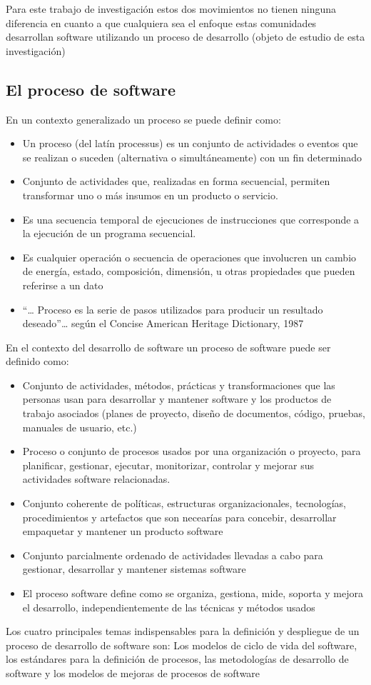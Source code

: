 Para este trabajo de investigación estos dos movimientos no tienen ninguna diferencia en cuanto a que cualquiera sea el enfoque estas comunidades desarrollan software utilizando un proceso de desarrollo (objeto de estudio de esta investigación)

\subsection[El proceso de software]{El proceso de software}
En un contexto generalizado un proceso se puede definir como:

\begin{itemize}
	\item Un proceso (del latín processus) es un conjunto de actividades o eventos que se realizan o suceden (alternativa o simultáneamente) con un fin determinado
	\item Conjunto de actividades que, realizadas en forma secuencial, permiten transformar uno o más insumos en un producto o servicio.
	\item Es una secuencia temporal de ejecuciones de instrucciones que corresponde a la ejecución de un programa secuencial.
	\item Es cualquier operación o secuencia de operaciones que involucren un cambio de energía, estado, composición, dimensión, u otras propiedades que pueden referirse a un dato
	\item {}``{\dots} Proceso es la serie de pasos utilizados para producir un resultado deseado''{\dots} según el Concise American Heritage Dictionary, 1987
\end{itemize}
En el contexto del desarrollo de software un proceso de software puede ser definido como:

\begin{itemize}
	\item Conjunto de actividades, métodos, prácticas y transformaciones que las personas usan para desarrollar y mantener software y los productos de trabajo asociados (planes de proyecto, diseño de documentos, código, pruebas, manuales de usuario, etc.)
	\item Proceso o conjunto de procesos usados por una organización o proyecto, para planificar, gestionar, ejecutar, monitorizar, controlar y mejorar sus actividades software relacionadas.
	\item Conjunto coherente de políticas, estructuras organizacionales, tecnologías, procedimientos y artefactos que son necearías para concebir, desarrollar empaquetar y mantener un producto software
	\item Conjunto parcialmente ordenado de actividades llevadas a cabo para gestionar, desarrollar y mantener sistemas software
	\item El proceso software define como se organiza, gestiona, mide, soporta y mejora el desarrollo, independientemente de las técnicas y métodos usados
\end{itemize}
Los cuatro principales temas indispensables para la definición y despliegue de un proceso de desarrollo de software son: Los modelos de ciclo de vida del software, los estándares para la definición de procesos, las metodologías de desarrollo de software y los modelos de mejoras de procesos de software

